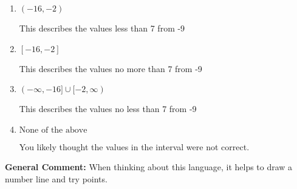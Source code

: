 \documentclass{extbook}[14pt]
\begin{document}
\begin{enumerate}
{\begin{enumerate}[label=\Alph*.]
This describes the values more than 7 from -9
\item \( (-16, -2) \)

This describes the values less than 7 from -9
\item \( [-16, -2] \)

This describes the values no more than 7 from -9
\item \( (-\infty, -16] \cup [-2, \infty) \)

This describes the values no less than 7 from -9
\item \( \text{None of the above} \)

You likely thought the values in the interval were not correct.
\end{enumerate}

\textbf{General Comment:} When thinking about this language, it helps to draw a number line and try points.
}
\end{enumerate}
\end{document}
